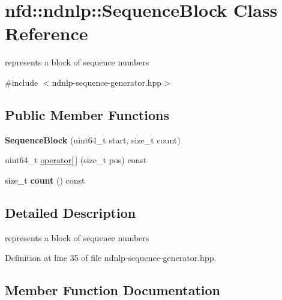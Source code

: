 \hypertarget{classnfd_1_1ndnlp_1_1SequenceBlock}{}\section{nfd\+:\+:ndnlp\+:\+:Sequence\+Block Class Reference}
\label{classnfd_1_1ndnlp_1_1SequenceBlock}


represents a block of sequence numbers  




{\ttfamily \#include $<$ndnlp-\/sequence-\/generator.\+hpp$>$}

\subsection*{Public Member Functions}
\begin{DoxyCompactItemize}
\item 
{\bfseries Sequence\+Block} (uint64\+\_\+t start, size\+\_\+t count)\hypertarget{classnfd_1_1ndnlp_1_1SequenceBlock_ac77a0ac1c8246ae60ed1ea7b684f8b98}{}\label{classnfd_1_1ndnlp_1_1SequenceBlock_ac77a0ac1c8246ae60ed1ea7b684f8b98}

\item 
uint64\+\_\+t \hyperlink{classnfd_1_1ndnlp_1_1SequenceBlock_a5526f23416a9a14f1cf4fd5954443f45}{operator\mbox{[}$\,$\mbox{]}} (size\+\_\+t pos) const
\item 
size\+\_\+t {\bfseries count} () const\hypertarget{classnfd_1_1ndnlp_1_1SequenceBlock_a165e48f34a42dea8b92749ada539786b}{}\label{classnfd_1_1ndnlp_1_1SequenceBlock_a165e48f34a42dea8b92749ada539786b}

\end{DoxyCompactItemize}


\subsection{Detailed Description}
represents a block of sequence numbers 

Definition at line 35 of file ndnlp-\/sequence-\/generator.\+hpp.



\subsection{Member Function Documentation}
